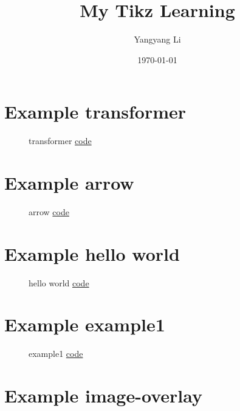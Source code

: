 \documentclass{article}
\title{My Tikz Learning}
\author{Yangyang Li}
\date{\today}
\begin{document}
\maketitle
\clearpage
\tableofcontents


\section{Example transformer}

\begin{figure}[H]
	\centering
	
	\caption{transformer \href{https:/github.com/cauliyang/learn_tikz/blob/main/transformer.tex}{code} }
	\label{fig:transformer}
\end{figure}

\section{Example arrow}

\begin{figure}[H]
	\centering
	
	\caption{arrow \href{https:/github.com/cauliyang/learn_tikz/blob/main/arrow.tex}{code} }
	\label{fig:arrow}
\end{figure}

\section{Example hello world}

\begin{figure}[H]
	\centering
	
	\caption{hello world \href{https:/github.com/cauliyang/learn_tikz/blob/main/hello_world.tex}{code} }
	\label{fig:hello world}
\end{figure}

\section{Example example1}

\begin{figure}[H]
	\centering
	
	\caption{example1 \href{https:/github.com/cauliyang/learn_tikz/blob/main/example1.tex}{code} }
	\label{fig:example1}
\end{figure}

\section{Example image-overlay}
\end{document}
